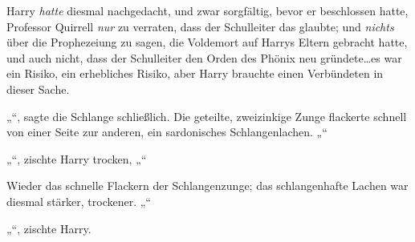 Harry \emph{hatte} diesmal nachgedacht, und zwar sorgfältig, bevor er beschlossen hatte, Professor Quirrell \emph{nur} zu verraten, dass der Schulleiter das glaubte; und \emph{nichts} über die Prophezeiung zu sagen, die Voldemort auf Harrys Eltern gebracht hatte, und auch nicht, dass der Schulleiter den Orden des Phönix neu gründete…es war ein Risiko, ein erhebliches Risiko, aber Harry brauchte einen Verbündeten in dieser Sache.

„“, sagte die Schlange schließlich. Die geteilte, zweizinkige Zunge flackerte schnell von einer Seite zur anderen, ein sardonisches Schlangenlachen. „“

„“, zischte Harry trocken, „“

Wieder das schnelle Flackern der Schlangenzunge; das schlangenhafte Lachen war diesmal stärker, trockener. „“

„“, zischte Harry.

